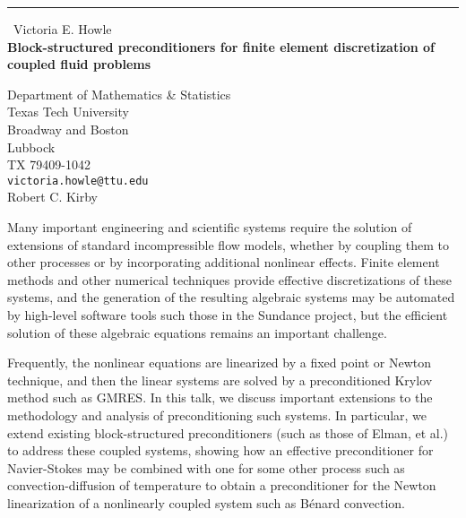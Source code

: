 \documentclass{report}
\begin{document}
\begin{center}
\rule{6in}{1pt} \
{\large Victoria E. Howle \\
{\bf Block-structured preconditioners for finite element discretization of coupled fluid problems }}

Department of Mathematics & Statistics \\ Texas Tech University \\ Broadway and Boston \\ Lubbock \\ TX 79409-1042
\\
{\tt victoria.howle@ttu.edu}\\
Robert C. Kirby\end{center}

Many important engineering and scientific systems require the solution of
extensions of standard incompressible flow models, whether by coupling
them to other processes or by incorporating additional nonlinear effects.
Finite element methods and other numerical techniques provide effective
discretizations of these systems, and the generation of the resulting
algebraic systems may be automated by high-level software tools such
those in the Sundance project, but the efficient solution of these
algebraic equations remains an important challenge.

Frequently, the nonlinear equations are linearized by a fixed point or
Newton technique, and then the linear systems are solved by a
preconditioned Krylov method such as GMRES. In this talk, we discuss
important extensions to the methodology and analysis of
preconditioning such systems. In particular, we extend existing
block-structured preconditioners (such as those of Elman, et al.) to
address these coupled systems, showing how an effective preconditioner
for Navier-Stokes may be combined with one for some other process such as
convection-diffusion of temperature to obtain a preconditioner for the
Newton linearization of a nonlinearly coupled system such as B\'enard
convection.
\end{document}
